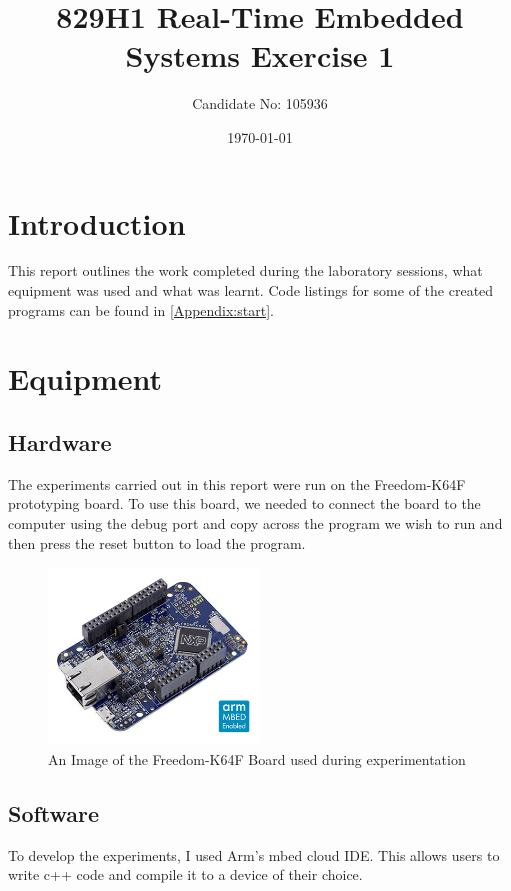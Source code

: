 \documentclass[a4paper,12pt]{scrartcl}
\title{829H1 Real-Time Embedded Systems Exercise 1}
\author{Candidate No: 105936}
\date{\today}
\begin{document}
	
	\begin{titlepage}
		\maketitle
	\end{titlepage}
	
	\tableofcontents
	\newpage
	
	\section{Introduction}
	{
		This report outlines the work completed during the laboratory sessions, what equipment was used and what was learnt. Code listings for some of the created programs can be found in \cref{Appendix:start}.
	}

	\section{Equipment}
	{
		\subsection{Hardware}{
			The experiments carried out in this report were run on the Freedom-K64F prototyping board\cite{nxpproducts2014}. To use this board, we needed to connect the board to the computer using the debug port and copy across the program we wish to run and then press the reset button to load the program.
			\begin{figure}[h]
				\centering
				\includegraphics[width=0.5\textwidth]{FRDM-K64F-ANGLE}
				\caption{An Image of the Freedom-K64F Board used during experimentation\cite{nxpproducts2014}}
				\label{img:FRDM-K64F}
			\end{figure}
		}
		\subsection{Software}
		{
			To develop the experiments, I used Arm's mbed cloud IDE. This allows users to write c++ code and compile it to a device of their choice. 
		}
	}
	
\end{document}
